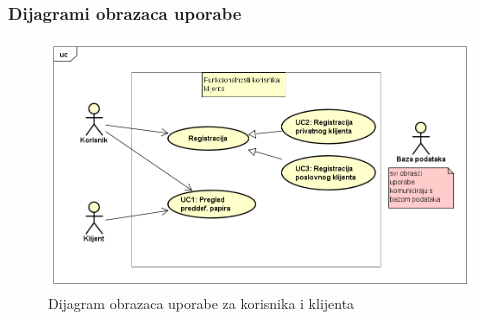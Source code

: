 				\subsubsection{Dijagrami obrazaca uporabe}
					\begin{center}
						\begin{figure}[H]
							\includegraphics[scale=0.7]{dijagrami/korisnik_klijent.PNG} 
							\centering
							\caption{Dijagram obrazaca uporabe za korisnika i klijenta}
							\label{fig:obr_up1}%
						\end{figure}
						

\end{center}
